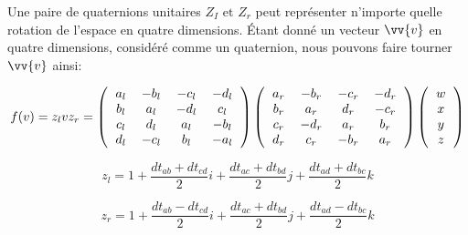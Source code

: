 Une paire de quaternions unitaires $Z_{I} \text{ et } Z_{r}$ peut
représenter n'importe quelle rotation de l'espace en quatre dimensions.
Étant donné un vecteur $\vv{v}$ en quatre dimensions, considéré comme 
un quaternion, nous pouvons faire tourner $\vv{v}$ ainsi:

\[
	f(v) = z_{l}vz_{r} =
	\left(
		\begin{tabular}{cccc}
			$a_{l}$ & $-b_{l}$ & $-c_{l}$ & $-d_{l}$ \\
			$b_{l}$ & $a_{l}$ & $-d_{l}$ & $c_{l}$ \\
			$c_{l}$ & $d_{l}$ & $a_{l}$ & $-b_{l}$ \\
			$d_{l}$ & $-c_{l}$ & $b_{l}$ & $-a_{l}$ 
		\end{tabular}
	\right)
	\left(
	\begin{tabular}{cccc}
		$a_{r}$ & $-b_{r}$ & $-c_{r}$ & $-d_{r}$ \\
		$b_{r}$ & $a_{r}$ & $d_{r}$ & $-c_{r}$ \\
		$c_{r}$ & $-d_{r}$ & $a_{r}$ & $b_{r}$ \\
		$d_{r}$ & $c_{r}$ & $-b_{r}$ & $a_{r}$ 
	\end{tabular}
	\right)
	\moq{w}{x}{y}{z}
\]

\[
	z_{l} = 1 + \frac{dt_{ab} + dt_{cd}}{2}i + 
	\frac{dt_{ac} + dt_{bd}}{2}j + \frac{dt_{ad} + dt_{bc}}{2}k
\]

\[
	z_{r} = 1 + \frac{dt_{ab} - dt_{cd}}{2}i + 
	\frac{dt_{ac} + dt_{bd}}{2}j + \frac{dt_{ad} - dt_{bc}}{2}k
\]
